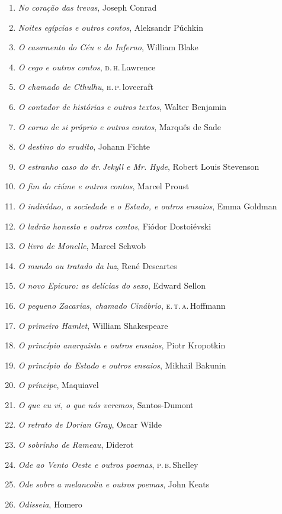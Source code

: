 \begin{enumerate}
\item \textit{No coração das trevas}, Joseph Conrad
\item \textit{Noites egípcias e outros contos}, Aleksandr Púchkin
\item \textit{O casamento do Céu e do Inferno}, William Blake
\item \textit{O cego e outros contos}, \textsc{d.\,h}.\,Lawrence
\item \textit{O chamado de Cthulhu}, \textsc{h.\,p.}\,lovecraft
\item \textit{O contador de histórias e outros textos}, Walter Benjamin
\item \textit{O corno de si próprio e outros contos}, Marquês de Sade
\item \textit{O destino do erudito}, Johann Fichte
\item \textit{O estranho caso do dr.\,Jekyll e Mr. Hyde}, Robert Louis Stevenson
\item \textit{O fim do ciúme e outros contos}, Marcel Proust
\item \textit{O indivíduo, a sociedade e o Estado, e outros ensaios}, Emma Goldman
\item \textit{O ladrão honesto e outros contos}, Fiódor Dostoiévski
\item \textit{O livro de Monelle}, Marcel Schwob
\item \textit{O mundo ou tratado da luz}, René Descartes
\item \textit{O novo Epicuro: as delícias do sexo}, Edward Sellon
\item \textit{O pequeno Zacarias, chamado Cinábrio}, \textsc{e.\,t.\,a.}\,Hoffmann
\item \textit{O primeiro Hamlet}, William Shakespeare
\item \textit{O princípio anarquista e outros ensaios}, Piotr Kropotkin
\item \textit{O princípio do Estado e outros ensaios}, Mikhail Bakunin
\item \textit{O príncipe}, Maquiavel
\item \textit{O que eu vi, o que nós veremos}, Santos-Dumont
\item \textit{O retrato de Dorian Gray}, Oscar Wilde
\item \textit{O sobrinho de Rameau}, Diderot
\item \textit{Ode ao Vento Oeste e outros poemas}, \textsc{p.\,b.}\,Shelley
\item \textit{Ode sobre a melancolia e outros poemas}, John Keats
\item \textit{Odisseia}, Homero

\end{enumerate}
